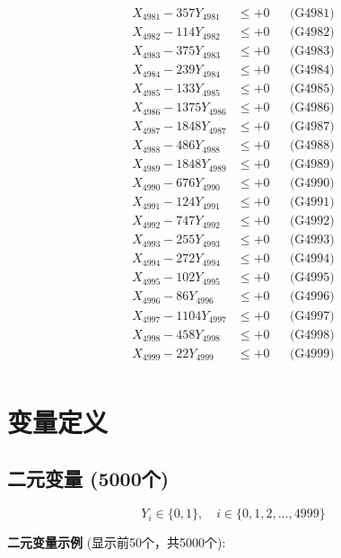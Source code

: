 \documentclass[a4paper,10pt]{article}
\begin{document}
{\begin{align}
\allowbreak
X_{4981} - 357Y_{4981} &\leq +0 && \text{(G4981)} \\
X_{4982} - 114Y_{4982} &\leq +0 && \text{(G4982)} \\
X_{4983} - 375Y_{4983} &\leq +0 && \text{(G4983)} \\
X_{4984} - 239Y_{4984} &\leq +0 && \text{(G4984)} \\
X_{4985} - 133Y_{4985} &\leq +0 && \text{(G4985)} \\
X_{4986} - 1375Y_{4986} &\leq +0 && \text{(G4986)} \\
X_{4987} - 1848Y_{4987} &\leq +0 && \text{(G4987)} \\
X_{4988} - 486Y_{4988} &\leq +0 && \text{(G4988)} \\
X_{4989} - 1848Y_{4989} &\leq +0 && \text{(G4989)} \\
X_{4990} - 676Y_{4990} &\leq +0 && \text{(G4990)} \\
\allowbreak
X_{4991} - 124Y_{4991} &\leq +0 && \text{(G4991)} \\
X_{4992} - 747Y_{4992} &\leq +0 && \text{(G4992)} \\
X_{4993} - 255Y_{4993} &\leq +0 && \text{(G4993)} \\
X_{4994} - 272Y_{4994} &\leq +0 && \text{(G4994)} \\
X_{4995} - 102Y_{4995} &\leq +0 && \text{(G4995)} \\
X_{4996} - 86Y_{4996} &\leq +0 && \text{(G4996)} \\
X_{4997} - 1104Y_{4997} &\leq +0 && \text{(G4997)} \\
X_{4998} - 458Y_{4998} &\leq +0 && \text{(G4998)} \\
X_{4999} - 22Y_{4999} &\leq +0 && \text{(G4999)} \\
\end{align}
}

\section{变量定义}

\subsection{二元变量 (5000个)}

\begin{equation}
Y_i \in \{0,1\}, \quad i \in \{0, 1, 2, \ldots, 4999\}
\end{equation}

\textbf{二元变量示例} (显示前50个，共5000个):
\end{document}
